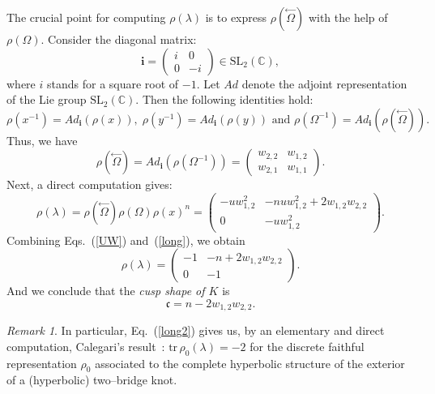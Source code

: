 \documentclass[a4paper]{amsart}
\theoremstyle{plain}
\theoremstyle{definition}
\theoremstyle{remark}
\newtheorem{remark}{Remark}%
\newcommand{\C}{{\mathbb C}}
\newcommand{\cusp}{{\mathfrak{c}}}
\newcommand{\SL}{{\mathrm{SL}_2(\C)}}
\begin{document}
The crucial point for computing $\rho(\lambda)$ is to express $\rho(\stackrel{\gets}{\Omega})$ with the help of $\rho(\Omega)$.  
Consider the diagonal matrix:
\[
\mathbf{i} = \left(\begin{array}{cc}i & 0 \\0 & -i\end{array}\right) \in \SL,
\]
where $i$ stands for a square root of $-1$. Let $Ad$ denote the adjoint representation of the Lie group $\SL$. Then the following identities hold:
\[
\rho(x^{-1}) = Ad_{\mathbf{i}} (\rho(x)), \; 
\rho(y^{-1}) = Ad_{\mathbf{i}} (\rho(y))  
\text{ and } 
\rho(\Omega^{-1}) =  Ad_{\mathbf{i}} (\rho(\stackrel{\gets}{\Omega})).
\]
Thus, we have
\[
 \rho(\stackrel{\gets}{\Omega}) 
= Ad_{\mathbf{i}} (\rho({\Omega}^{-1})) 
= \left(
  \begin{array}{cc}
    w_{2,2} & w_{1,2} \\
    w_{2,1} & w_{1,1}
  \end{array}
  \right).
\]
Next, a direct computation gives:
\begin{equation}\label{long}
\rho(\lambda) = \rho(\stackrel{\gets}{\Omega}) \rho(\Omega) \rho(x)^n =\left(\begin{array}{cc}-u w^2_{1,2} & -n u w^2_{1,2} + 2w_{1,2}w_{2,2} \\0 & -u w^2_{1,2}\end{array}\right).
\end{equation}
Combining Eqs.~(\ref{UW}) and~(\ref{long}), we obtain
\begin{equation}\label{long2}
\rho(\lambda) = \left(\begin{array}{cc}-1 & -n + 2w_{1,2}w_{2,2} \\0 & -1\end{array}\right).
\end{equation}
And we conclude that the \emph{cusp shape of $K$} is 
\begin{equation}\label{cuspshape_bridge}
\cusp = n -  2w_{1,2}w_{2,2}.
\end{equation}

\begin{remark}
In particular, Eq.~(\ref{long2}) gives us, by an elementary and direct computation, Calegari's result~\cite{Calegari}: $\mathrm{tr}\, \rho_0(\lambda) = - 2$ for the discrete faithful representation $\rho_0$ associated to the complete hyperbolic structure of the exterior of a (hyperbolic) two--bridge knot.
\end{remark}
\end{document}
